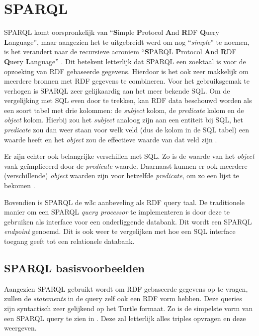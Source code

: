 \section{SPARQL}
\label{sec:sparql}

SPARQL komt oorspronkelijk van ``\textbf{S}imple \textbf{P}rotocol \textbf{A}nd \textbf{R}DF \textbf{Q}uery \textbf{L}anguage'', maar aangezien het te uitgebreidt werd om nog ``\textit{simple}'' te noemen, is het verandert naar de recursieve acroniem ``\textbf{S}PARQL \textbf{P}rotocol \textbf{A}nd \textbf{R}DF \textbf{Q}uery \textbf{L}anguage'' \cite{sparql2011acronym}. Dit betekent letterlijk dat SPARQL een zoektaal is voor de opzoeking van RDF gebaseerde gegevens. Hierdoor is het ook zeer makkelijk om meerdere bronnen met RDF gegevens te combineren. Voor het gebruiksgemak te verhogen is SPARQL zeer gelijkaardig aan het meer bekende SQL. Om de vergelijking met SQL even door te trekken, kan RDF data beschouwd worden als een soort tabel met drie kolommen: de \textit{subject} kolom, de \textit{predicate} kolom en de \textit{object} kolom. Hierbij zou het \textit{subject} analoog zijn aan een entiteit bij SQL, het \textit{predicate} zou dan weer staan voor welk veld (dus de kolom in de SQL tabel) een waarde heeft en het \textit{object} zou de effectieve waarde van dat veld zijn \cite{sparql2013querylanguage}. 

Er zijn echter ook belangrijke verschillen met SQL. Zo is de waarde van het \textit{object} vaak geïmpliceerd door de \textit{predicate} waarde. Daarnaast kunnen er ook meerdere (verschillende) \textit{object} waarden zijn voor hetzelfde \textit{predicate}, om zo een lijst te bekomen \cite{sparql2013querylanguage}.

Bovendien is SPARQL de \acrshort{w3c} aanbeveling als RDF query taal. De traditionele manier om een SPARQL \textit{query processor} te implementeren is door deze te gebruiken als interface voor een onderliggende databank. Dit wordt een SPARQL \textit{endpoint} genoemd. Dit is ook weer te vergelijken met hoe een SQL interface toegang geeft tot een relationele databank.

\subsection{SPARQL basisvoorbeelden}

Aangezien SPARQL gebruikt wordt om RDF gebaseerde gegevens op te vragen, zullen de \textit{statements} in de query zelf ook een RDF vorm hebben. Deze queries zijn syntactisch zeer gelijkend op het Turtle formaat. Zo is de simpelste vorm van een SPARQL query te zien in . Deze zal letterlijk alles triples opvragen en deze weergeven. 

